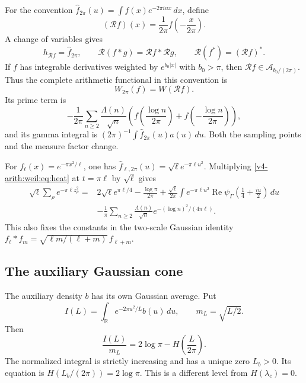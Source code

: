 For the convention
\(\widehat f_{2\pi}(u)=\int f(x)e^{-2\pi iux}\,dx\), define
\[
 (\mathcal R f)(x)=\frac1{2\pi}f\left(-\frac{x}{2\pi}\right).
\]
A change of variables gives
\begin{equation}
 h_{\mathcal Rf}=\widehat f_{2\pi},\qquad
 \mathcal R(f*g)=\mathcal Rf*\mathcal Rg,\qquad
 \mathcal R(f^*)=(\mathcal Rf)^*.
 \label{v4-arith:weil:eq:rescaling}
\end{equation}
If \(f\) has integrable derivatives weighted by \(e^{b_0|x|}\)
with \(b_0>\pi\), then \(\mathcal Rf\in\mathscr A_{b_0/(2\pi)}\).
Thus the complete arithmetic functional in this convention is
\[
 W_{2\pi}(f)=W(\mathcal Rf).
\]
Its prime term is
\[
 -\frac1{2\pi}\sum_{n\ge2}\frac{\Lambda(n)}{\sqrt n}
    \left(f\left(\frac{\log n}{2\pi}\right)
             +f\left(-\frac{\log n}{2\pi}\right)\right),
\]
and its gamma integral is
\((2\pi)^{-1}\int\widehat f_{2\pi}(u)a(u)\,du\).
Both the sampling points and the measure factor change.

For \(f_\ell(x)=e^{-\pi x^2/\ell}\), one has
\(\widehat f_{\ell,2\pi}(u)=\sqrt\ell e^{-\pi\ell u^2}\).
Multiplying \eqref{v4-arith:weil:eq:heat} at \(t=\pi\ell\)
by \(\sqrt\ell\) gives
\[
 \begin{aligned}
 \sqrt\ell\sum_\rho e^{-\pi\ell z_\rho^2}
 ={}&2\sqrt\ell e^{\pi\ell/4}-\frac{\log\pi}{2\pi}
 +\frac{\sqrt\ell}{2\pi}\int e^{-\pi\ell u^2}
                  \operatorname{Re}\psi_\Gamma(\tfrac14+\tfrac{iu}{2})\,du\\
 &-\frac1\pi\sum_{n\ge2}\frac{\Lambda(n)}{\sqrt n}
                         e^{-(\log n)^2/(4\pi\ell)}.
 \end{aligned}
\]
This also fixes the constants in the two-scale Gaussian identity
\(f_\ell*f_m=\sqrt{\ell m/(\ell+m)}\,f_{\ell+m}\).

\subsection{The auxiliary Gaussian cone}

The auxiliary density \(b\) has its own Gaussian average. Put
\[
 I(L)=\int_{\mathbb R}e^{-2\pi u^2/L}b(u)\,du,\qquad m_L=\sqrt{L/2}.
\]
Then
\begin{equation}
 \frac{I(L)}{m_L}=2\log\pi-H\left(\frac{L}{2\pi}\right).
 \label{v4-arith:weil:eq:auxiliary-H}
\end{equation}
The normalized integral is strictly increasing and has a unique
zero \(L_b>0\). Its equation is
\(H(L_b/(2\pi))=2\log\pi\).
This is a different level from \(H(\lambda_c)=0\).

